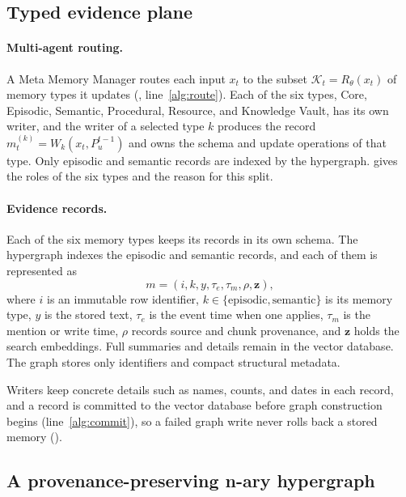\subsection{Typed evidence plane}
\label{sec:typed-evidence}

\paragraph{Multi-agent routing.}
A Meta Memory Manager routes each input \(x_t\) to the subset
\(\mathcal K_t=R_\theta(x_t)\) of memory types it updates (,
line~\ref{alg:route}). Each of the six types, Core, Episodic, Semantic,
Procedural, Resource, and Knowledge Vault, has its own writer, and the writer
of a selected type \(k\) produces the record \(m_t^{(k)}=W_k(x_t,P_u^{t-1})\)
and owns the schema and update operations of that type. Only episodic and
semantic records are indexed by the hypergraph.  gives
the roles of the six types and the reason for this split.

\paragraph{Evidence records.}
Each of the six memory types keeps its records in its own schema. The hypergraph
indexes the episodic and semantic records, and each of them is represented as
\begin{equation}
    m=(i,k,y,\tau_e,\tau_m,\rho,\mathbf z),
    \label{eq:memory-record}
\end{equation}
where \(i\) is an immutable row identifier,
\(k\in\{\mathrm{episodic},\mathrm{semantic}\}\) is its memory type, \(y\) is the
stored text, \(\tau_e\) is the event time when one applies, \(\tau_m\) is the
mention or write time, \(\rho\) records source and chunk provenance, and
\(\mathbf z\) holds the search embeddings. Full summaries and details remain in
the vector database. The graph stores only identifiers and compact structural metadata.

Writers keep concrete details such as names, counts, and dates in each record,
and a record is committed to the vector database before graph construction
begins (line~\ref{alg:commit}), so a failed graph write never rolls back a
stored memory ().

\subsection{A provenance-preserving n-ary hypergraph}
\label{sec:hypergraph}

